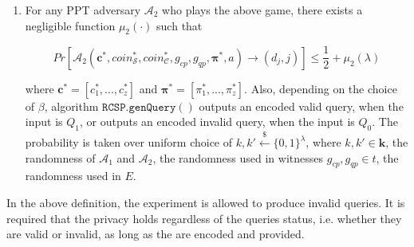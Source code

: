\begin{definition}[RC-S-P Privacy]
\begin{enumerate}
\item For any PPT adversary $\mathcal{A}_{\scriptscriptstyle 2}$ who plays the above game, there exists a negligible function $\mu_{\scriptscriptstyle 2}(\cdot)$ such that


{\small
$$ Pr\left[\mathcal{A}_{\scriptscriptstyle 2}(\bm{c}^{\scriptscriptstyle *},coin^{\scriptscriptstyle *}_{\scriptscriptstyle \mathcal S},coin^{\scriptscriptstyle *}_{\scriptscriptstyle\mathcal C}, g_{\scriptscriptstyle cp},  g_{\scriptscriptstyle qp},\bm{\pi}^{\scriptscriptstyle *},a)\rightarrow (d_{\scriptscriptstyle j},j)\right]\leq \frac{1}{2}+ \mu_{\scriptscriptstyle 2}(\lambda)$$
}

where $\bm{c}^{\scriptscriptstyle *}=[{c}^{\scriptscriptstyle *}_{\scriptscriptstyle 1},...,{c}^{\scriptscriptstyle *}_{\scriptscriptstyle z}]$ and $\bm{\pi}^{\scriptscriptstyle *}=[\pi^{\scriptscriptstyle *}_{\scriptscriptstyle 1},...,\pi^{\scriptscriptstyle *}_{\scriptscriptstyle z}]$.  Also, depending on the choice of $\beta$, algorithm $\mathtt{RCSP}.\mathtt{genQuery}()$ outputs an encoded valid query, when the input is $Q_{\scriptscriptstyle 1}$, or outputs an encoded invalid query, when the input is $Q_{\scriptscriptstyle 0}$. The probability is taken over uniform  choice of $k,k'\stackrel{\scriptscriptstyle\$}\leftarrow \{0,1\}^{\scriptscriptstyle\lambda}$, where $k,k'\in\bm{k}$, the randomness of $\mathcal{A}_{\scriptscriptstyle 1}$ and $\mathcal{A}_{\scriptscriptstyle 2}$,  the randomness used in witnesses $g_{\scriptscriptstyle cp}, g_{\scriptscriptstyle qp}\in t$,  the randomness used in  $E$.
\end{enumerate}
\end{definition}
 
In the above definition, the experiment is allowed to produce  invalid queries. It is required that  the privacy holds regardless of the queries status, i.e. whether they are valid or invalid, as long as the are encoded and provided.  
 
 
 
